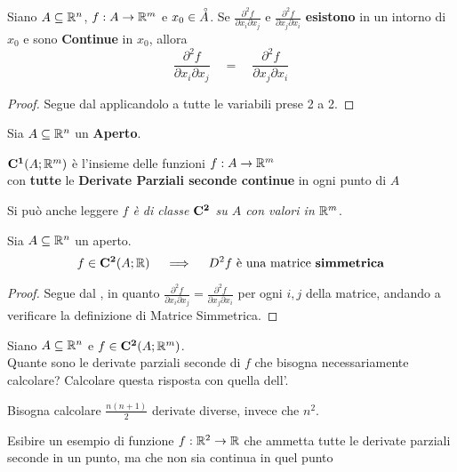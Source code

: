 \begin{corollary}
	Siano $A \subseteq \mathbb{R}^n$, $f:A \to \mathbb{R}^m$ e $x_0 \in \accentset{\circ}{A}$. Se $\frac{\partial^2 f}{\partial x_i \partial x_j}$ e $\frac{\partial^2 f}{\partial x_j \partial x_i}$ \textbf{esistono} in un intorno di $x_0$ e sono \textbf{Continue} in $x_0$, allora
	\[\frac{\partial^2 f}{\partial x_i \partial x_j} \quad = \quad \frac{\partial^2 f}{\partial x_j \partial x_i}\]
	\begin{proof}
		Segue dal  applicandolo a tutte le variabili prese 2 a 2.
	\end{proof}
\end{corollary}

\begin{definition}
	Sia $A \subseteq \mathbb{R}^n$ un \textbf{Aperto}.
	\begin{center}
		$\mathbf{C^{1}}(A; \mathbb{R}^m)$ è l'insieme delle funzioni $f:A \to \mathbb{R}^m$\\
		con \textbf{tutte} le \textbf{Derivate Parziali seconde continue} in ogni punto di $A$
	\end{center}
	Si può anche leggere \textit{$f$ è di classe $\mathbf{C^{2}}$ su $A$ con valori in $\mathbb{R}^m$}.
\end{definition}

\begin{corollary}
	Sia $A \subseteq \mathbb{R}^n$ un aperto.
	\[f \in \mathbf{C^{2}}(A;\mathbb{R}) \quad \implies \quad D^2 f \text{ è una matrice \textbf{simmetrica}}\]
	\begin{proof}
		Segue dal , in quanto $\frac{\partial^2 f}{\partial x_i \partial x_j} = \frac{\partial^2 f}{\partial x_j \partial x_i}$ per ogni $i, j$ della matrice, andando a verificare la definizione di Matrice Simmetrica.
	\end{proof}
\end{corollary}
\begin{exercise}
	Siano $A \subseteq \mathbb{R}^n$ e $f \in \mathbf{C^{2}}(A;\mathbb{R}^m)$.\\
	Quante sono le derivate parziali seconde di $f$ che bisogna necessariamente calcolare? Calcolare questa risposta con quella dell'.
	\begin{solution}
		Bisogna calcolare $\frac{n(n+1)}{2}$ derivate diverse, invece che $n^2$.
	\end{solution}
\end{exercise}
\begin{exercise}
	Esibire un esempio di funzione $f:\mathbb{R}^2 \to \mathbb{R}$ che ammetta tutte le derivate parziali seconde in un punto, ma che non sia continua in quel punto
\end{exercise}

